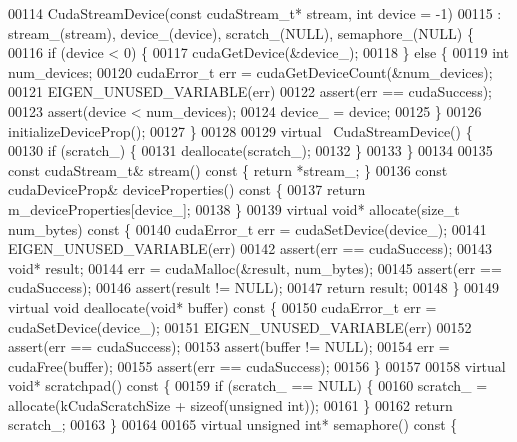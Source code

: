 \begin{DoxyCode}
00114   CudaStreamDevice(\textcolor{keyword}{const} cudaStream\_t* stream, \textcolor{keywordtype}{int} device = -1)
00115       : stream\_(stream), device\_(device), scratch\_(NULL), semaphore\_(NULL) \{
00116     \textcolor{keywordflow}{if} (device < 0) \{
00117       cudaGetDevice(&device\_);
00118     \} \textcolor{keywordflow}{else} \{
00119       \textcolor{keywordtype}{int} num\_devices;
00120       cudaError\_t err = cudaGetDeviceCount(&num\_devices);
00121       EIGEN\_UNUSED\_VARIABLE(err)
00122       assert(err == cudaSuccess);
00123       assert(device < num\_devices);
00124       device\_ = device;
00125     \}
00126     initializeDeviceProp();
00127   \}
00128 
00129   \textcolor{keyword}{virtual} ~CudaStreamDevice() \{
00130     \textcolor{keywordflow}{if} (scratch\_) \{
00131       deallocate(scratch\_);
00132     \}
00133   \}
00134 
00135   \textcolor{keyword}{const} cudaStream\_t& stream()\textcolor{keyword}{ const }\{ \textcolor{keywordflow}{return} *stream\_; \}
00136   \textcolor{keyword}{const} cudaDeviceProp& deviceProperties()\textcolor{keyword}{ const }\{
00137     \textcolor{keywordflow}{return} m\_deviceProperties[device\_];
00138   \}
00139   \textcolor{keyword}{virtual} \textcolor{keywordtype}{void}* allocate(\textcolor{keywordtype}{size\_t} num\_bytes)\textcolor{keyword}{ const }\{
00140     cudaError\_t err = cudaSetDevice(device\_);
00141     EIGEN\_UNUSED\_VARIABLE(err)
00142     assert(err == cudaSuccess);
00143     \textcolor{keywordtype}{void}* result;
00144     err = cudaMalloc(&result, num\_bytes);
00145     assert(err == cudaSuccess);
00146     assert(result != NULL);
00147     \textcolor{keywordflow}{return} result;
00148   \}
00149   \textcolor{keyword}{virtual} \textcolor{keywordtype}{void} deallocate(\textcolor{keywordtype}{void}* buffer)\textcolor{keyword}{ const }\{
00150     cudaError\_t err = cudaSetDevice(device\_);
00151     EIGEN\_UNUSED\_VARIABLE(err)
00152     assert(err == cudaSuccess);
00153     assert(buffer != NULL);
00154     err = cudaFree(buffer);
00155     assert(err == cudaSuccess);
00156   \}
00157 
00158   \textcolor{keyword}{virtual} \textcolor{keywordtype}{void}* scratchpad()\textcolor{keyword}{ const }\{
00159     \textcolor{keywordflow}{if} (scratch\_ == NULL) \{
00160       scratch\_ = allocate(kCudaScratchSize + \textcolor{keyword}{sizeof}(\textcolor{keywordtype}{unsigned} \textcolor{keywordtype}{int}));
00161     \}
00162     \textcolor{keywordflow}{return} scratch\_;
00163   \}
00164 
00165   \textcolor{keyword}{virtual} \textcolor{keywordtype}{unsigned} \textcolor{keywordtype}{int}* semaphore()\textcolor{keyword}{ const }\{

\end{DoxyCode}
